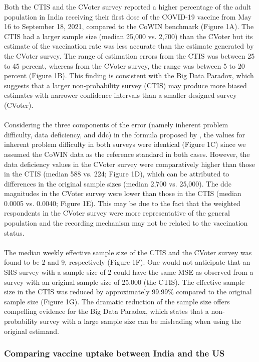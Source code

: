 \documentclass{article}
\begin{document}
Both the CTIS and the CVoter survey reported a higher percentage of the adult population in India receiving their first dose of the COVID-19 vaccine from May 16 to September 18, 2021, compared to the CoWIN benchmark (Figure 1A). The CTIS had a larger sample size (median 25,000 vs. 2,700) than the CVoter but its estimate of the vaccination rate was less accurate than the estimate generated by the CVoter survey. The range of estimation errors from the CTIS was between 25 to 45 percent, whereas from the CVoter survey, the range was between 5 to 20 percent (Figure 1B). This finding is consistent with the Big Data Paradox, which suggests that a larger non-probability survey (CTIS) may produce more biased estimates with narrower confidence intervals than a smaller designed survey (CVoter). 
\\
\\
Considering the three components of the error (namely inherent problem difficulty, data deficiency, and ddc) in the formula proposed by \cite{Meng2018}, the values for inherent problem difficulty in both surveys were identical (Figure 1C) since we assumed the CoWIN data as the reference standard in both cases. However, the data deficiency values in the CVoter survey were comparatively higher than those in the CTIS (median 588 vs. 224; Figure 1D), which can be attributed to differences in the original sample sizes (median 2,700 vs. 25,000). The ddc magnitudes in the CVoter survey were lower than those in the CTIS (median 0.0005 vs. 0.0040; Figure 1E). This may be due to the fact that the weighted respondents in the CVoter survey were more representative of the general population and the recording mechanism may not be related to the vaccination status.
\\
\\
The median weekly effective sample size of the CTIS and the CVoter survey was found to be 2 and 9, respectively (Figure 1F). One would not anticipate that an SRS survey with a sample size of 2 could have the same MSE as observed from a survey with an original sample size of 25,000 (the CTIS). The effective sample size in the CTIS was reduced by approximately 99.99\% compared to the original sample size (Figure 1G). The dramatic reduction of the sample size offers compelling evidence for the Big Data Paradox, which states that a non-probability survey with a large sample size can be misleading when using the original estimand.

\subsubsection{Comparing vaccine uptake between India and the US}
\end{document}
